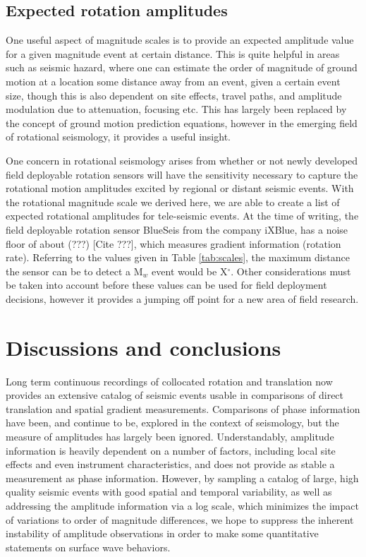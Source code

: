 \documentclass{gji}
\begin{document}
\subsection{Expected rotation amplitudes}
One useful aspect of magnitude scales is to provide an expected amplitude value for a given magnitude event at certain distance. This is quite helpful in areas such as seismic hazard, where one can estimate the order of magnitude of ground motion at a location some distance away from an event, given a certain event size, though this is also dependent on site effects, travel paths, and amplitude modulation due to attenuation, focusing etc. This has largely been replaced by the concept of ground motion prediction equations, however in the emerging field of rotational seismology, it provides a useful insight.%

One concern in rotational seismology arises from whether or not newly developed field deployable rotation sensors will have the sensitivity necessary to capture the rotational motion amplitudes excited by regional or distant seismic events. With the rotational magnitude scale we derived here, we are able to create a list of expected rotational amplitudes for tele-seismic events. At the time of writing, the field deployable rotation sensor BlueSeis from the company iXBlue, has a noise floor of about (???) [Cite ???], which measures gradient information (rotation rate). Referring to the values given in Table \ref{tab:scales}, the maximum distance the sensor can be to detect a M$_w$ event would be X$^\circ$. Other considerations must be taken into account before these values can be used for field deployment decisions, however it provides a jumping off point for a new area of field research.


\section{Discussions and conclusions}
Long term continuous recordings of collocated rotation and translation now provides an extensive catalog of seismic events usable in comparisons of direct translation and spatial gradient measurements. Comparisons of phase information have been, and continue to be, explored in the context of seismology, but the measure of amplitudes has largely been ignored. Understandably, amplitude information is heavily dependent on a number of factors, including local site effects and even instrument characteristics, and does not provide as stable a measurement as phase information. However, by sampling a catalog of large, high quality seismic events with good spatial and temporal variability, as well as addressing the amplitude information via a log scale, which minimizes the impact of variations to order of magnitude differences, we hope to suppress the inherent instability of amplitude observations in order to make some quantitative statements on surface wave behaviors.
\end{document}
